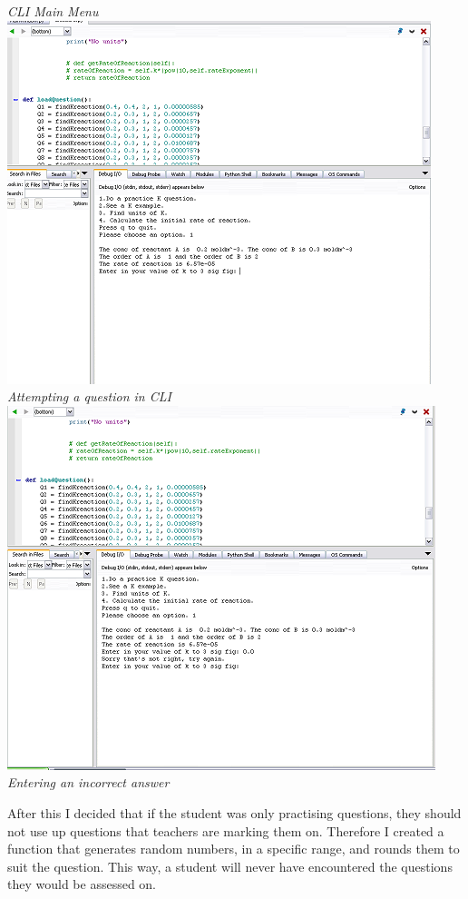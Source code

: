 \documentclass[a4paper,12pt]{report}
\begin{document}
\emph{CLI Main Menu}\\
\includegraphics{CLI02}\\
\emph{Attempting a question in CLI}\\
\includegraphics{CLI03}\\
\emph{Entering an incorrect answer}\\
\bigskip

After this I decided that if the student was only practising questions, they should not use up questions that teachers are marking them on. Therefore I created a function that generates random numbers, in a specific range, and rounds them to suit the question. This way, a student will never have encountered the questions they would be assessed on.
\end{document}

